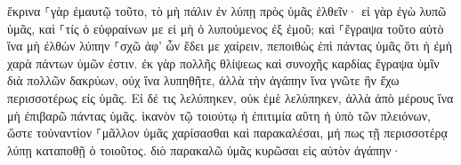 \documentclass{openreader}
\begin{document}
ἔκρινα ⸀γὰρ ἐμαυτῷ τοῦτο, τὸ μὴ πάλιν ἐν λύπῃ πρὸς ὑμᾶς ἐλθεῖν· 
εἰ γὰρ ἐγὼ λυπῶ ὑμᾶς, καὶ ⸀τίς ὁ εὐφραίνων με εἰ μὴ ὁ λυπούμενος ἐξ ἐμοῦ; 
καὶ ⸀ἔγραψα τοῦτο αὐτὸ ἵνα μὴ ἐλθὼν λύπην ⸀σχῶ ἀφ’ ὧν ἔδει με χαίρειν, πεποιθὼς ἐπὶ πάντας ὑμᾶς ὅτι ἡ ἐμὴ χαρὰ πάντων ὑμῶν ἐστιν. 
ἐκ γὰρ πολλῆς θλίψεως καὶ συνοχῆς καρδίας ἔγραψα ὑμῖν διὰ πολλῶν δακρύων, οὐχ ἵνα λυπηθῆτε, ἀλλὰ τὴν ἀγάπην ἵνα γνῶτε ἣν ἔχω περισσοτέρως εἰς ὑμᾶς. 
Εἰ δέ τις λελύπηκεν, οὐκ ἐμὲ λελύπηκεν, ἀλλὰ ἀπὸ μέρους ἵνα μὴ ἐπιβαρῶ πάντας ὑμᾶς. 
ἱκανὸν τῷ τοιούτῳ ἡ ἐπιτιμία αὕτη ἡ ὑπὸ τῶν πλειόνων, 
ὥστε τοὐναντίον ⸀μᾶλλον ὑμᾶς χαρίσασθαι καὶ παρακαλέσαι, μή πως τῇ περισσοτέρᾳ λύπῃ καταποθῇ ὁ τοιοῦτος. 
διὸ παρακαλῶ ὑμᾶς κυρῶσαι εἰς αὐτὸν ἀγάπην· 
\end{document}
